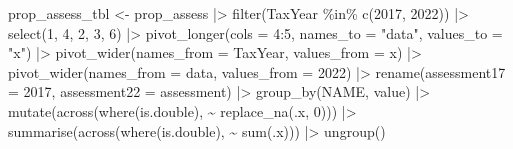 \documentclass[
  letterpaper,
  DIV=11,
  numbers=noendperiod]{scrartcl}
\newenvironment{Shaded}{\begin{snugshade}}{\end{snugshade}}
\newcommand{\AttributeTok}[1]{\textcolor[rgb]{0.40,0.45,0.13}{#1}}
\newcommand{\DecValTok}[1]{\textcolor[rgb]{0.68,0.00,0.00}{#1}}
\newcommand{\FunctionTok}[1]{\textcolor[rgb]{0.28,0.35,0.67}{#1}}
\newcommand{\NormalTok}[1]{\textcolor[rgb]{0.00,0.23,0.31}{#1}}
\newcommand{\OtherTok}[1]{\textcolor[rgb]{0.00,0.23,0.31}{#1}}
\newcommand{\SpecialCharTok}[1]{\textcolor[rgb]{0.37,0.37,0.37}{#1}}
\newcommand{\StringTok}[1]{\textcolor[rgb]{0.13,0.47,0.30}{#1}}
\begin{document}
\begin{Shaded}
\begin{Highlighting}[]
\NormalTok{prop\_assess\_tbl }\OtherTok{\textless{}{-}}\NormalTok{ prop\_assess }\SpecialCharTok{|\textgreater{}} 
  \FunctionTok{filter}\NormalTok{(TaxYear }\SpecialCharTok{\%in\%} \FunctionTok{c}\NormalTok{(}\DecValTok{2017}\NormalTok{, }\DecValTok{2022}\NormalTok{)) }\SpecialCharTok{|\textgreater{}} 
  \FunctionTok{select}\NormalTok{(}\DecValTok{1}\NormalTok{, }\DecValTok{4}\NormalTok{, }\DecValTok{2}\NormalTok{, }\DecValTok{3}\NormalTok{, }\DecValTok{6}\NormalTok{) }\SpecialCharTok{|\textgreater{}} 
  \FunctionTok{pivot\_longer}\NormalTok{(}\AttributeTok{cols =} \DecValTok{4}\SpecialCharTok{:}\DecValTok{5}\NormalTok{, }\AttributeTok{names\_to =} \StringTok{"data"}\NormalTok{, }\AttributeTok{values\_to =} \StringTok{"x"}\NormalTok{) }\SpecialCharTok{|\textgreater{}} 
  \FunctionTok{pivot\_wider}\NormalTok{(}\AttributeTok{names\_from =}\NormalTok{ TaxYear,}
              \AttributeTok{values\_from =}\NormalTok{ x) }\SpecialCharTok{|\textgreater{}} 
  \FunctionTok{pivot\_wider}\NormalTok{(}\AttributeTok{names\_from =}\NormalTok{ data,}
              \AttributeTok{values\_from =} \StringTok{\textquotesingle{}2022\textquotesingle{}}\NormalTok{) }\SpecialCharTok{|\textgreater{}} 
  \FunctionTok{rename}\NormalTok{(}\AttributeTok{assessment17 =} \StringTok{\textquotesingle{}2017\textquotesingle{}}\NormalTok{, }\AttributeTok{assessment22 =}\NormalTok{ assessment) }\SpecialCharTok{|\textgreater{}} 
  \FunctionTok{group\_by}\NormalTok{(NAME, value) }\SpecialCharTok{|\textgreater{}} 
  \FunctionTok{mutate}\NormalTok{(}\FunctionTok{across}\NormalTok{(}\FunctionTok{where}\NormalTok{(is.double), }\SpecialCharTok{\textasciitilde{}} \FunctionTok{replace\_na}\NormalTok{(.x, }\DecValTok{0}\NormalTok{))) }\SpecialCharTok{|\textgreater{}} 
  \FunctionTok{summarise}\NormalTok{(}\FunctionTok{across}\NormalTok{(}\FunctionTok{where}\NormalTok{(is.double), }\SpecialCharTok{\textasciitilde{}} \FunctionTok{sum}\NormalTok{(.x))) }\SpecialCharTok{|\textgreater{}} 
  \FunctionTok{ungroup}\NormalTok{()}


\end{Highlighting}
\end{Shaded}
\end{document}

